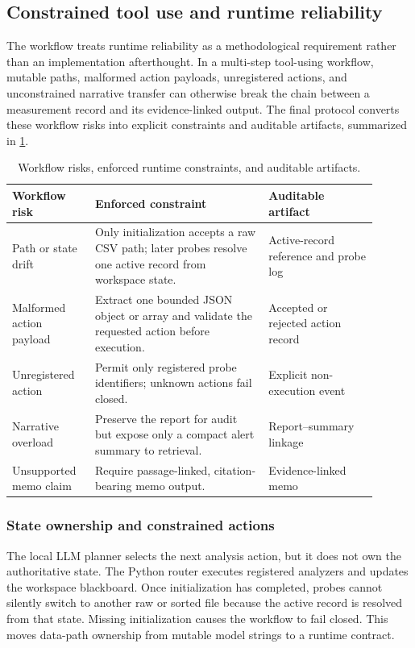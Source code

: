 \subsection{Constrained tool use and runtime reliability}
\label{sec:agent-design}

The workflow treats runtime reliability as a methodological requirement rather than an implementation afterthought. In a multi-step tool-using workflow, mutable paths, malformed action payloads, unregistered actions, and unconstrained narrative transfer can otherwise break the chain between a measurement record and its evidence-linked output. The final protocol converts these workflow risks into explicit constraints and auditable artifacts, summarized in \cref{tab:agent-design}.

\begin{table}[H]
  \centering
  \footnotesize
  \caption{Workflow risks, enforced runtime constraints, and auditable artifacts.}
  \label{tab:agent-design}
  \begin{tabular}{@{}p{0.20\linewidth}p{0.43\linewidth}p{0.27\linewidth}@{}}
    \toprule
    Workflow risk & Enforced constraint & Auditable artifact \\
    \midrule
    Path or state drift &
    Only initialization accepts a raw CSV path; later probes resolve one active record from workspace state. &
    Active-record reference and probe log \\
    Malformed action payload &
    Extract one bounded JSON object or array and validate the requested action before execution. &
    Accepted or rejected action record \\
    Unregistered action &
    Permit only registered probe identifiers; unknown actions fail closed. &
    Explicit non-execution event \\
    Narrative overload &
    Preserve the report for audit but expose only a compact alert summary to retrieval. &
    Report--summary linkage \\
    Unsupported memo claim &
    Require passage-linked, citation-bearing memo output. &
    Evidence-linked memo \\
    \bottomrule
  \end{tabular}
\end{table}

\subsubsection{State ownership and constrained actions}
The local LLM planner selects the next analysis action, but it does not own the authoritative state. The Python router executes registered analyzers and updates the workspace blackboard. Once initialization has completed, probes cannot silently switch to another raw or sorted file because the active record is resolved from that state. Missing initialization causes the workflow to fail closed. This moves data-path ownership from mutable model strings to a runtime contract.


